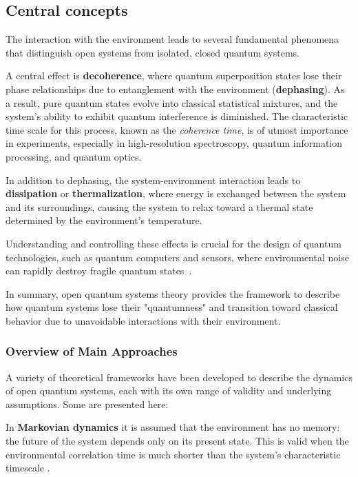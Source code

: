 \subsection{Central concepts}
The interaction with the environment leads to several fundamental phenomena that distinguish open systems from isolated, closed quantum systems.

\noindent
A central effect is \textbf{decoherence}, where quantum superposition states lose their phase relationships due to entanglement with the environment (\textbf{dephasing}). As a result, pure quantum states evolve into classical statistical mixtures, and the system's ability to exhibit quantum interference is diminished. The characteristic time scale for this process, known as the \emph{coherence time}, is of utmost importance in experiments, especially in high-resolution spectroscopy, quantum information processing, and quantum optics.

\noindent
In addition to dephasing, the system-environment interaction leads to \textbf{dissipation} or \textbf{thermalization}, where energy is exchanged between the system and its surroundings, causing the system to relax toward a thermal state determined by the environment's temperature.

\noindent
Understanding and controlling these effects is crucial for the design of quantum technologies, such as quantum computers and sensors, where environmental noise can rapidly destroy fragile quantum states~\cite{laddetal2010quantumcomputers}.  

\noindent
In summary, open quantum systems theory provides the framework to describe how quantum systems lose their "quantumness" and transition toward classical behavior due to unavoidable interactions with their environment.


\subsubsection{Overview of Main Approaches}
\label{subsec:overview_main_approaches_oqs}

\noindent
A variety of theoretical frameworks have been developed to describe the dynamics of open quantum systems, each with its own range of validity and underlying assumptions. Some are presented here:

\noindent
In \textbf{Markovian dynamics} it is assumed that the environment has no memory: the future of the system depends only on its present state. This is valid when the environmental correlation time is much shorter than the system's characteristic timescale . 

